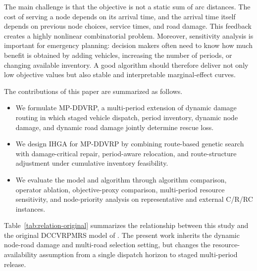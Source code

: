 ﻿\documentclass[preprint,12pt,authoryear]{elsarticle}
\begin{document}
The main challenge is that the objective is not a static sum of arc distances. The cost of serving a node depends on its arrival time, and the arrival time itself depends on previous node choices, service times, and road damage. This feedback creates a highly nonlinear combinatorial problem. Moreover, sensitivity analysis is important for emergency planning: decision makers often need to know how much benefit is obtained by adding vehicles, increasing the number of periods, or changing available inventory. A good algorithm should therefore deliver not only low objective values but also stable and interpretable marginal-effect curves.

The contributions of this paper are summarized as follows.
\begin{itemize}
\item We formulate MP-DDVRP, a multi-period extension of dynamic damage routing in which staged vehicle dispatch, period inventory, dynamic node damage, and dynamic road damage jointly determine rescue loss.
\item We design IHGA for MP-DDVRP by combining route-based genetic search with damage-critical repair, period-aware relocation, and route-structure adjustment under cumulative inventory feasibility.
\item We evaluate the model and algorithm through algorithm comparison, operator ablation, objective-proxy comparison, multi-period resource sensitivity, and node-priority analysis on representative and external C/R/RC instances.
\end{itemize}

Table~\ref{tab:relation-original} summarizes the relationship between this study and the original DCCVRPMRS model of \citet{zhao2026routing}. The present work inherits the dynamic node-road damage and multi-road selection setting, but changes the resource-availability assumption from a single dispatch horizon to staged multi-period release.
\end{document}
